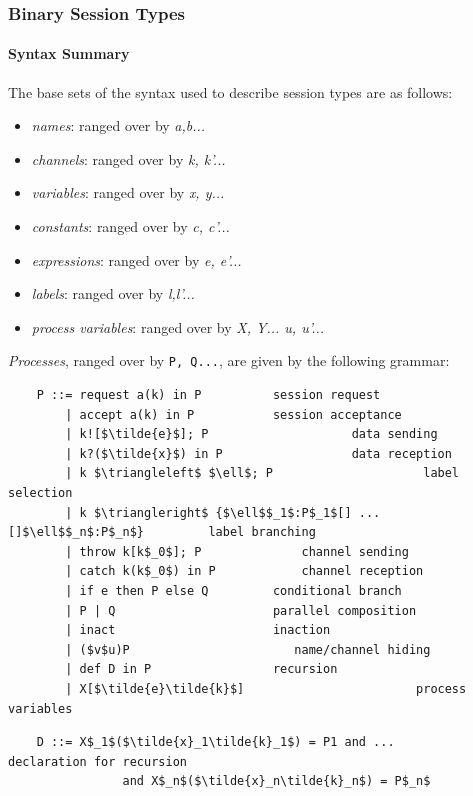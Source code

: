 \documentclass[11pt]{scrartcl}
\begin{document}

\subsubsection{Binary Session Types}
\paragraph{Syntax Summary}

The base sets of the syntax used to describe session types are as follows:

\begin{itemize}[noitemsep]
	\item[] \emph{names}: ranged over by \emph{a,b...}
	\item[] \emph{channels}: ranged over by \emph{k, k'...}
	\item[] \emph{variables}: ranged over by \emph{x, y...}
	\item[] \emph{constants}: ranged over by \emph{c, c'...}
	\item[] \emph{expressions}: ranged over by \emph{e, e'...}
	\item[] \emph{labels}: ranged over by \emph{l,l'...}
	\item[] \emph{process variables}: ranged over by \emph{X, Y... u, u'...}
\end{itemize}

\emph{Processes}, ranged over by \texttt{P, Q...}, are given by the following 
grammar:
\\

\begin{lstlisting}
    P ::= request a(k) in P          session request
        | accept a(k) in P           session acceptance
        | k![$\tilde{e}$]; P                    data sending
        | k?($\tilde{x}$) in P                  data reception
        | k $\triangleleft$ $\ell$; P                     label selection
        | k $\triangleright$ {$\ell$$_1$:P$_1$[] ... []$\ell$$_n$:P$_n$}         label branching
        | throw k[k$_0$]; P              channel sending
        | catch k(k$_0$) in P            channel reception
        | if e then P else Q         conditional branch
        | P | Q                      parallel composition
        | inact                      inaction
        | ($v$u)P                       name/channel hiding
        | def D in P                 recursion
        | X[$\tilde{e}\tilde{k}$]                        process variables
\end{lstlisting}
\begin{lstlisting}
    D ::= X$_1$($\tilde{x}_1\tilde{k}_1$) = P1 and ...           declaration for recursion
                and X$_n$($\tilde{x}_n\tilde{k}_n$) = P$_n$ 
\end{lstlisting}
\end{document}
